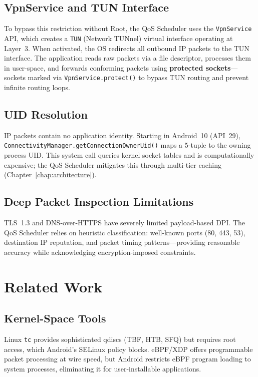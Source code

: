 \subsection{VpnService and TUN Interface}

To bypass this restriction without Root, the QoS Scheduler uses the \texttt{VpnService} API, which creates a \texttt{TUN} (Network TUNnel) virtual interface operating at Layer~3. When activated, the OS redirects all outbound IP packets to the TUN interface. The application reads raw packets via a file descriptor, processes them in user-space, and forwards conforming packets using \textbf{protected sockets}---sockets marked via \texttt{VpnService.protect()} to bypass TUN routing and prevent infinite routing loops.

\subsection{UID Resolution}

IP packets contain no application identity. Starting in Android~10 (API~29), \texttt{ConnectivityManager.getConnectionOwnerUid()} maps a 5-tuple to the owning process UID. This system call queries kernel socket tables and is computationally expensive; the QoS Scheduler mitigates this through multi-tier caching (Chapter~\ref{chap:architecture}).

\subsection{Deep Packet Inspection Limitations}

TLS~1.3 and DNS-over-HTTPS have severely limited payload-based DPI. The QoS Scheduler relies on heuristic classification: well-known ports (80, 443, 53), destination IP reputation, and packet timing patterns---providing reasonable accuracy while acknowledging encryption-imposed constraints.

\section{Related Work}
\label{sec:related_work}

\subsection{Kernel-Space Tools}

Linux \texttt{tc} \cite{stallings_2014} provides sophisticated qdiscs (TBF, HTB, SFQ) but requires root access, which Android's SELinux policy blocks. eBPF/XDP \cite{vieira_2020} offers programmable packet processing at wire speed, but Android restricts eBPF program loading to system processes, eliminating it for user-installable applications.

